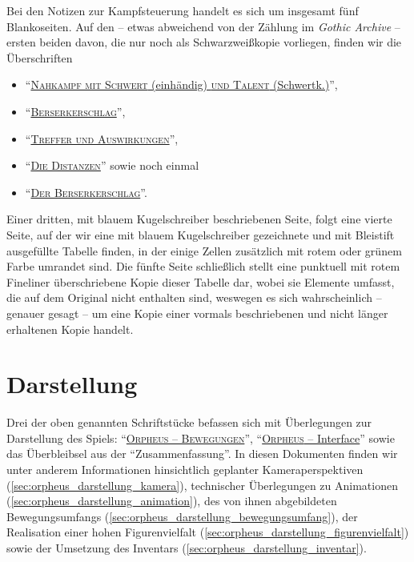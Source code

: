 \documentclass[a5paper,pagesize,numbers=noenddot]{scrbook}
\begin{document}
Bei den Notizen zur Kampfsteuerung handelt es sich um insgesamt fünf Blankoseiten.
Auf den -- etwas abweichend von der Zählung im \textit{Gothic Archive} -- ersten beiden davon, die nur noch als Schwarzweißkopie vorliegen, finden wir die Überschriften

\begin{itemize}
   \item \enquote{\uline{\textsc{Nahkampf mit Schwert} (einhändig) \textsc{und Talent} (Schwertk.)}},
   \item \enquote{\uline{\textsc{Berserkerschlag}}},
   \item \enquote{\uline{\textsc{Treffer und Auswirkungen}}},
   \item \enquote{\uline{\textsc{Die Distanzen}}} sowie noch einmal
   \item \enquote{\uline{\textsc{Der Berserkerschlag}}}.
\end{itemize}

Einer dritten, mit blauem Kugelschreiber beschriebenen Seite, folgt eine vierte Seite, auf der wir eine mit blauem Kugelschreiber gezeichnete und mit Bleistift ausgefüllte Tabelle finden, in der einige Zellen zusätzlich mit rotem oder grünem Farbe umrandet sind.
Die fünfte Seite schließlich stellt eine punktuell mit rotem Fineliner überschriebene Kopie dieser Tabelle dar, wobei sie Elemente umfasst, die auf dem Original nicht enthalten sind, weswegen es sich wahrscheinlich -- genauer gesagt -- um eine Kopie einer vormals beschriebenen und nicht länger erhaltenen Kopie handelt.


\section{Darstellung}\label{sec:orpheus_darstellung}
Drei der oben genannten Schriftstücke befassen sich mit Überlegungen zur Darstellung des Spiels:
\enquote{\uline{\textsc{Orpheus -- Bewegungen}}}, \enquote{\uline{\textsc{Orpheus} -- Interface}} sowie das Überbleibsel aus der \enquote{Zusammenfassung}.
In diesen Dokumenten finden wir unter anderem Informationen hinsichtlich geplanter Kameraperspektiven (\autoref{sec:orpheus_darstellung_kamera}), technischer Überlegungen zu Animationen (\autoref{sec:orpheus_darstellung_animation}), des von ihnen abgebildeten Bewegungsumfangs (\autoref{sec:orpheus_darstellung_bewegungsumfang}), der Realisation einer hohen Figurenvielfalt (\autoref{sec:orpheus_darstellung_figurenvielfalt}) sowie der Umsetzung des Inventars (\autoref{sec:orpheus_darstellung_inventar}).
\end{document}
